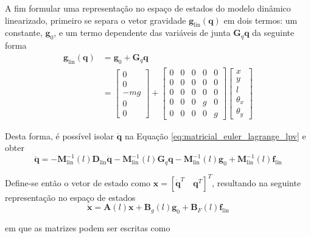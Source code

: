 \documentclass{ppgeesa}
\begin{document}
A fim formular uma representação no espaço de estados do modelo dinâmico linearizado, primeiro se separa o vetor gravidade $\mathbf{g}_{\text{lin}}(\mathbf{q})$ em dois termos: um constante, $\mathbf{g}_0$, e um termo dependente das variáveis de junta $\mathbf{G}_q \mathbf{q}$ da seguinte forma
\begin{align}
  \mathbf{g}_{\text{lin}}(\mathbf{q}) &= \mathbf{g}_0 + \mathbf{G}_q \mathbf{q} \nonumber\\
&=
\begin{bmatrix} 0 \\ 0 \\ -mg \\ 0 \\ 0 \end{bmatrix} + 
\begin{bmatrix}
0 & 0 & 0 & 0 & 0 \\
0 & 0 & 0 & 0 & 0 \\
0 & 0 & 0 & 0 & 0 \\
0 & 0 & 0 & g & 0 \\
0 & 0 & 0 & 0 & g
\end{bmatrix}
\begin{bmatrix} x \\ y \\ l \\ \theta_x \\ \theta_y \end{bmatrix}
\end{align}

Desta forma, é possível isolar $\ddot{\mathbf{q}}$ na Equação \ref{eq:matricial_euler_lagrange_lpv} e obter
\begin{equation}
\ddot{\mathbf{q}} = -\mathbf{M}_{\text{lin}}^{-1}(l)\mathbf{D}_{\text{lin}}\dot{\mathbf{q}} - \mathbf{M}_{\text{lin}}^{-1}(l)\mathbf{G}_q \mathbf{q} - \mathbf{M}_{\text{lin}}^{-1}(l)\mathbf{g}_0 + \mathbf{M}_{\text{lin}}^{-1}(l)\mathbf{f}_{\text{lin}}
\end{equation}

Define-se então o vetor de estado como $\mathbf{x} = [\dot{\mathbf{q}}^T \quad \mathbf{q}^T]^T$, resultando na seguinte representação no espaço de estados
\begin{equation}
\dot{\mathbf{x}} = \mathbf{A}(l)\mathbf{x} + \mathbf{B}_g(l)\mathbf{g}_0 + \mathbf{B}_F(l)\mathbf{f}_{\text{lin}}
\end{equation}

\noindent em que as matrizes podem ser escritas como
\end{document}
